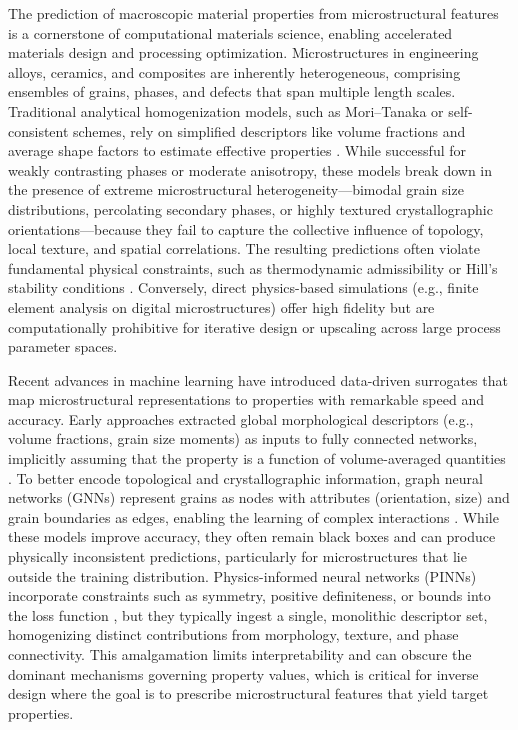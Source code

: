\documentclass{article}
\begin{document}
The prediction of macroscopic material properties from microstructural features is a cornerstone of computational materials science, enabling accelerated materials design and processing optimization. Microstructures in engineering alloys, ceramics, and composites are inherently heterogeneous, comprising ensembles of grains, phases, and defects that span multiple length scales. Traditional analytical homogenization models, such as Mori–Tanaka or self-consistent schemes, rely on simplified descriptors like volume fractions and average shape factors to estimate effective properties \cite{moritanaka}. While successful for weakly contrasting phases or moderate anisotropy, these models break down in the presence of extreme microstructural heterogeneity—bimodal grain size distributions, percolating secondary phases, or highly textured crystallographic orientations—because they fail to capture the collective influence of topology, local texture, and spatial correlations. The resulting predictions often violate fundamental physical constraints, such as thermodynamic admissibility or Hill's stability conditions \cite{hill}. Conversely, direct physics-based simulations (e.g., finite element analysis on digital microstructures) offer high fidelity but are computationally prohibitive for iterative design or upscaling across large process parameter spaces.

Recent advances in machine learning have introduced data-driven surrogates that map microstructural representations to properties with remarkable speed and accuracy. Early approaches extracted global morphological descriptors (e.g., volume fractions, grain size moments) as inputs to fully connected networks, implicitly assuming that the property is a function of volume-averaged quantities \cite{liu}. To better encode topological and crystallographic information, graph neural networks (GNNs) represent grains as nodes with attributes (orientation, size) and grain boundaries as edges, enabling the learning of complex interactions \cite{nguyen}. While these models improve accuracy, they often remain black boxes and can produce physically inconsistent predictions, particularly for microstructures that lie outside the training distribution. Physics-informed neural networks (PINNs) incorporate constraints such as symmetry, positive definiteness, or bounds into the loss function \cite{raissi_pinn}, but they typically ingest a single, monolithic descriptor set, homogenizing distinct contributions from morphology, texture, and phase connectivity. This amalgamation limits interpretability and can obscure the dominant mechanisms governing property values, which is critical for inverse design where the goal is to prescribe microstructural features that yield target properties.
\end{document}
